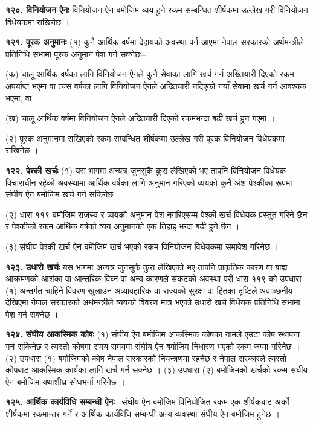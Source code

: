 \textbf{१२०. विनियोजन ऐनः} विनियोजन ऐन बमोजिम व्यय हुने रकम सम्बन्धित शीर्षकमा उल्लेख गरी विनियोजन विधेयकमा राखिनेछ ।

\textbf{१२१. पूरक अनुमानः} (१) कुनै आर्थिक वर्षमा देहायको अवस्था पर्न आएमा नेपाल सरकारको अर्थमन्त्रीले प्रतिनिधि सभामा पूरक अनुमान पेश गर्न सक्नेछः–

(क) चालू आर्थिक वर्षका लागि विनियोजन ऐनले कुनै सेवाका लागि खर्च गर्न अख्तियारी दिएको रकम अपर्याप्त भएमा वा त्यस वर्षका लागि विनियोजन ऐनले अख्तियारी नदिएको नयाँ सेवामा खर्च गर्न आवश्यक भएमा, वा

(ख) चालू आर्थिक वर्षमा विनियोजन ऐनले अख्तियारी दिएको रकमभन्दा बढी खर्च हुन गएमा ।

(२) पूरक अनुमानमा राखिएको रकम सम्बन्धित शीर्षकमा उल्लेख गरी पूरक विनियोजन विधेयकमा राखिनेछ ।

\textbf{१२२. पेश्की खर्चः} (१) यस भागमा अन्यत्र जुनसुकै कुरा लेखिएको भए तापनि विनियोजन विधेयक विचाराधीन रहेको अवस्थामा आर्थिक वर्षका लागि अनुमान गरिएको व्ययको कुनै अंश पेश्कीका रूपमा संघीय ऐन बमोजिम खर्च गर्न सकिनेछ ।

(२) धारा ११९ बमोजिम राजस्व र व्ययको अनुमान पेश नगरिएसम्म पेश्की खर्च विधेयक प्रस्तुत गरिने छैन र पेश्कीको रकम आर्थिक वर्षको व्यय अनुमानको एक तिहाइ भन्दा बढी हुने छैन ।

(३) संघीय पेश्की खर्च ऐन बमोेजिम खर्च भएको रकम विनियोजन विधेयकमा समावेश गरिनेछ ।

\textbf{१२३. उधारो खर्चः} यस भागमा अन्यत्र जुनसुकै कुरा लेखिएको भए तापनि प्राकृतिक कारण वा बाह्य आक्रमणको आशंका वा आन्तरिक विघ्न वा अन्य कारणले संकटको अवस्था परी धारा ११९ को उपधारा (१) अन्तर्गत चाहिने विवरण खुलाउन अव्यावहारिक वा राज्यको सुरक्षा वा हितका दृष्टिले अवाञ्छनीय देखिएमा नेपाल सरकारको अर्थमन्त्रीले व्ययको विवरण मात्र भएको उधारो खर्च विधेयक प्रतिनिधि सभामा पेश गर्न सक्नेछ ।

\textbf{१२४. संघीय आकस्मिक कोषः} (१) संघीय ऐन बमोजिम आकस्मिक कोषका नामले एउटा कोष स्थापना गर्न सकिनेछ र त्यस्तो कोषमा समय समयमा संघीय ऐन बमोजिम निर्धारण भएको रकम जम्मा गरिनेछ ।
(२) उपधारा (१) बमोजिमको कोष नेपाल सरकारको नियन्त्रणमा रहनेछ र नेपाल सरकारले त्यस्तो कोषबाट आकस्मिक कार्यका लागि खर्च
गर्न सक्नेछ ।
(३) उपधारा (२) बमोजिमको खर्चको रकम संघीय ऐन बमोजिम यथाशीध्र सोधभर्ना गरिनेछ ।

\textbf{१२५. आर्थिक कार्यविधि सम्बन्धी ऐनः}  संघीय ऐन बमोजिम विनियोजित रकम एक शीर्षकबाट अर्को शीर्षकमा रकमान्तर गर्ने र आर्थिक कार्यविधि सम्बन्धी अन्य व्यवस्था संघीय ऐन बमोजिम हुनेछ ।